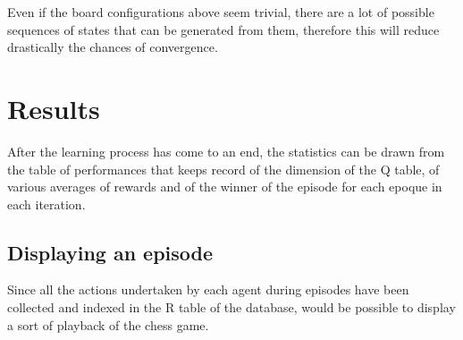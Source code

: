 \documentclass{article}
\begin{document}
				Even if the board configurations above seem trivial, there are a lot of possible sequences of states that can be generated from them, therefore this will reduce drastically the chances of convergence.



   				\newpage
             
				
				\section{Results}
				After the learning process has come to an end, the statistics can be drawn from the table of performances that keeps record of the dimension of the Q table, of various averages of rewards and of the winner of the episode for each epoque in each iteration.\medskip\\
				

				\subsection{Displaying an episode}
				Since all the actions undertaken by each agent during episodes have been collected and indexed in the R table of the database, would be possible to display a sort of playback of the chess game.\medskip\\
\end{document}
